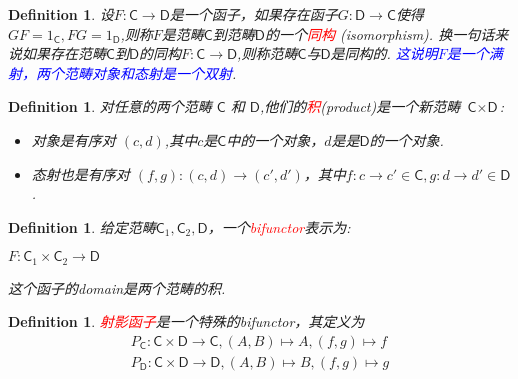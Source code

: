 \documentclass{article}
\newtheorem{definition}[theorem]{Definition}
\newcommand*{\cat}[1]{\textsf{#1}\xspace}
\newcommand{\redt}[1]{\textcolor{red}{#1}}
\newcommand{\bluet}[1]{\textcolor{blue}{#1}}
\begin{document}
\begin{definition}
\rm 设$F \colon \cat{C} \rightarrow \cat{D}$是一个函子，如果存在函子$G \colon \cat{D} \rightarrow \cat{C}$使得$GF=1_{\cat{C}},FG = 1_{\cat{D}}$,则称$F$是范畴$\cat{C}$到范畴$\cat{D}$的一个\redt{同构} (isomorphism). 换一句话来说如果存在范畴$\cat{C}$到$\cat{D}$的同构$F \colon \cat{C} \rightarrow \cat{D}$,则称范畴$\cat{C}$与$\cat{D}$是同构的. \bluet{这说明$F$是一个满射，两个范畴对象和态射是一个双射}.
\end{definition}



\begin{definition}
\rm 对任意的两个范畴 $\cat{C}$ 和 $\cat{D}$,他们的\redt{积}(product)是一个新范畴 $\cat{C} \times \cat{D}$:
\begin{itemize}
	\item 对象是有序对 $\left(c,d \right)$,其中$c$是$\cat{C}$中的一个对象，$d$是是$\cat{D}$的一个对象.
	\item 态射也是有序对 $\left(f,g \right) \colon \left(c,d\right) \rightarrow \left(c',d'\right)$，其中$f\colon c \rightarrow c' \in \cat{C}, g \colon d \rightarrow d' \in \cat{D}$.
\end{itemize}
\end{definition}

\begin{definition}
\rm 给定范畴$\cat{C}_1,\cat{C}_2,\cat{D}$，一个\redt{bifunctor}表示为:
\begin{center}
$F \colon \cat{C}_1 \times \cat{C}_2 \rightarrow \cat{D}$
\end{center}
这个函子的domain是两个范畴的积. 
\end{definition}


\begin{definition}
\rm \redt{射影函子}是一个特殊的bifunctor，其定义为
$$
\begin{aligned}
P_{\cat{C}} \colon \cat{C} \times \cat{D} \rightarrow \cat{C},\left( A,B \right)\mapsto A,\left( f,g \right)\mapsto f \\
P_{\cat{D}} \colon \cat{C} \times \cat{D} \rightarrow \cat{D},\left( A,B \right)\mapsto B,\left( f,g \right)\mapsto g
\end{aligned}
$$
\end{definition}
\end{document}
